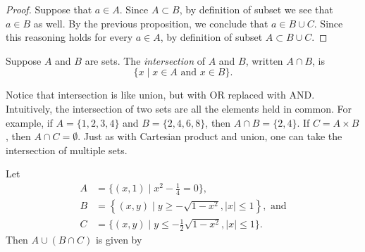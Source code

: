 \documentclass{tufte-book}
\begin{document}
\begin{proof}
  Suppose that $a \in A$. Since $A \subset B$, by definition of subset we see that $a \in B$ as well. By the previous proposition, we conclude that $a \in B \cup C$. Since this reasoning holds for every $a \in A$, by definition of subset $A \subset B \cup C$.
\end{proof}

\begin{definition}
  Suppose $A$ and $B$ are sets. The \emph{intersection} of $A$ and $B$, written $A \cap B$, is
  \[
  \{x \mid x \in A \text{ and } x \in B\}.
  \]
\end{definition}
Notice that intersection is like union, but with OR replaced with AND. Intuitively, the intersection of two sets are all the elements held in common. For example, if $A = \{1, 2, 3, 4\}$ and $B = \{2, 4, 6, 8\}$, then $A \cap B = \{2, 4\}$. If $C = A \times B$, then $A \cap C = \emptyset$. Just as with Cartesian product and union, one can take the intersection of multiple sets.

\begin{example}\label{ex:filled-smile}
  Let
  \begin{align*}
    A &= \bigg\{(x, 1) \mid x^2 - \frac14 = 0\bigg\},\\
    B &= \left\{(x,y) \mid y \geq -\sqrt{1-x^2}, |x| \leq 1\right\}, \text{ and}\\
    C &= \bigg\{(x,y) \mid y \leq -\frac12\sqrt{1-x^2}, |x| \leq 1\bigg\}.
  \end{align*}
  Then $A \cup (B \cap C)$ is given by
    \begin{center}
  \end{center}

\end{example}
\end{document}
